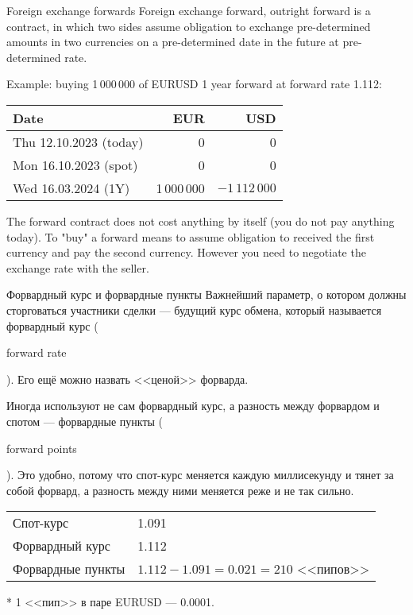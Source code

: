 \documentclass{beamer}
\newcommand{\en}[1]{\begin{otherlanguage}{english}#1\end{otherlanguage}}
\begin{document}
\begin{frame}{Foreign exchange forwards}
\justify
\alert{Foreign exchange forward, outright forward} is a contract, in which two sides assume obligation to exchange pre-determined amounts in two currencies on a pre-determined date in the future at pre-determined rate. 

\justify
Example: buying 1\,000\,000 of EURUSD 1 year forward at forward rate 1.112:

\centering
\begin{tabular}{l|r|r}
Date                          & EUR & USD \\ \hline
Thu 12.10.2023 (today)  & 0   & 0   \\
Mon 16.10.2023 (spot) & 0   & 0   \\
Wed 16.03.2024 (1Y)   & 1\,000\,000 & $-1\,112\,000$
\end{tabular}

\justify
The forward contract does not cost anything by itself (you do not pay anything today). To "buy" a forward means to assume obligation to received the first currency and pay the second currency. However you need to negotiate the exchange rate with the seller.
\end{frame}



\begin{frame}{Форвардный курс и форвардные пункты}
\justify
Важнейший параметр, о котором должны сторговаться участники сделки --- будущий курс обмена, который называется \alert{форвардный курс} (\en{forward rate}). Его ещё можно назвать <<ценой>> форварда.

\justify
Иногда используют не сам форвардный курс, а разность между форвардом и спотом --- \alert{форвардные пункты} (\en{forward points}). Это удобно, потому что спот-курс меняется каждую миллисекунду и тянет за собой форвард, а разность между ними меняется реже и не так сильно.

\vspace{\baselineskip}
\centering
\begin{tabular}{l|l}
Спот-курс & 1.091 \\
Форвардный курс & 1.112 \\
\hline
Форвардные пункты & $1.112 - 1.091 = 0.021 = 210$ <<пипов>>
\end{tabular}

\justify
* 1 <<пип>> в паре EURUSD --- 0.0001.
\end{frame}
\end{document}
